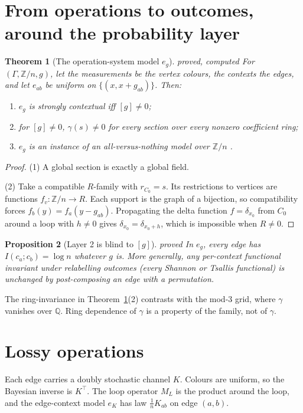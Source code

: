 \documentclass[11pt]{article}
\newtheorem{theorem}{Theorem}[section]
\newtheorem{proposition}[theorem]{Proposition}
\theoremstyle{definition}
\theoremstyle{remark}
\newcommand{\Z}{\mathbb{Z}}
\newcommand{\Q}{\mathbb{Q}}
\newcommand{\st}[1]{\textsf{\small\color{gray}#1}}
\begin{document}
\section{From operations to outcomes, around the probability layer}
\begin{theorem}[The operation-system model $e_g$]\label{thm:eg}\st{proved, computed}
For $(\Gamma,\Z/n,g)$, let the measurements be the vertex colours, the contexts the edges, and let $e_{ab}$ be uniform on $\{(x,x+g_{ab})\}$. Then:
\begin{enumerate}
  \item $e_g$ is strongly contextual iff $[g]\ne0$;
  \item for $[g]\ne0$, $\gamma(s)\ne0$ for every section over every nonzero coefficient ring;
  \item $e_g$ is an instance of an all-versus-nothing model over $\Z/n$ \cite{abklm15}.
\end{enumerate}
\end{theorem}
\begin{proof}
(1) A global section is exactly a global field.

(2) Take a compatible $R$-family with $r_{C_0}=s$. Its restrictions to vertices are functions $f_v:\Z/n\to R$. Each support is the graph of a bijection, so compatibility forces $f_b(y)=f_a(y-g_{ab})$. Propagating the delta function $f=\delta_{x_0}$ from $C_0$ around a loop with $h\ne0$ gives $\delta_{x_0}=\delta_{x_0+h}$, which is impossible when $R\ne0$.
\end{proof}
\begin{proposition}[Layer 2 is blind to {$[g]$}]\label{prop:blind-eg}\st{proved}
In $e_g$, every edge has $I(c_a;c_b)=\log n$ whatever $g$ is. More generally, any per-context functional invariant under relabelling outcomes (every Shannon or Tsallis functional) is unchanged by post-composing an edge with a permutation.
\end{proposition}
\noindent The ring-invariance in Theorem~\ref{thm:eg}(2) contrasts with the mod-3 grid, where $\gamma$ vanishes over $\Q$. Ring dependence of $\gamma$ is a property of the family, not of $\gamma$.

\section{Lossy operations}
Each edge carries a doubly stochastic channel $K$. Colours are uniform, so the Bayesian inverse is $K^\top$. The loop operator $M_L$ is the product around the loop, and the edge-context model $e_K$ has law $\tfrac1nK_{ab}$ on edge $(a,b)$.
\end{document}
